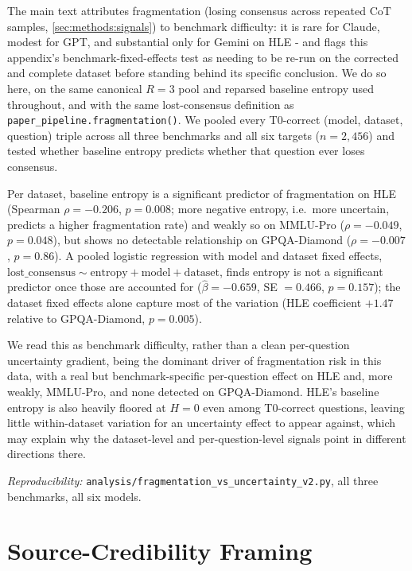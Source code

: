 The main text attributes fragmentation (losing consensus across repeated CoT samples, \autoref{sec:methods:signals}) to benchmark difficulty: it is rare for Claude, modest for GPT, and substantial only for Gemini on HLE - and flags this appendix's benchmark-fixed-effects test as needing to be re-run on the corrected and complete dataset before standing behind its specific conclusion. We do so here, on the same canonical $R=3$ pool and reparsed baseline entropy used throughout, and with the same lost-consensus definition as \texttt{paper\_pipeline.fragmentation()}. We pooled every T0-correct (model, dataset, question) triple across all three benchmarks and all six targets ($n=2{,}456$) and tested whether baseline entropy predicts whether that question ever loses consensus.

Per dataset, baseline entropy is a significant predictor of fragmentation on HLE (Spearman $\rho=-0.206$, $p=0.008$; more negative entropy, i.e.\ more uncertain, predicts a higher fragmentation rate) and weakly so on MMLU-Pro ($\rho=-0.049$, $p=0.048$), but shows no detectable relationship on GPQA-Diamond ($\rho=-0.007$, $p=0.86$). A pooled logistic regression with model and dataset fixed effects, $\mathrm{lost\_consensus} \sim \mathrm{entropy} + \mathrm{model} + \mathrm{dataset}$, finds entropy is not a significant predictor once those are accounted for ($\hat\beta=-0.659$, SE $=0.466$, $p=0.157$); the dataset fixed effects alone capture most of the variation (HLE coefficient $+1.47$ relative to GPQA-Diamond, $p=0.005$).

We read this as benchmark difficulty, rather than a clean per-question uncertainty gradient, being the dominant driver of fragmentation risk in this data, with a real but benchmark-specific per-question effect on HLE and, more weakly, MMLU-Pro, and none detected on GPQA-Diamond. HLE's baseline entropy is also heavily floored at $H=0$ even among T0-correct questions, leaving little within-dataset variation for an uncertainty effect to appear against, which may explain why the dataset-level and per-question-level signals point in different directions there.

{\footnotesize\emph{Reproducibility:} \texttt{analysis/fragmentation\_vs\_uncertainty\_v2.py}, all three benchmarks, all six models.}

\section{Source-Credibility Framing}
\label{app:persona}

